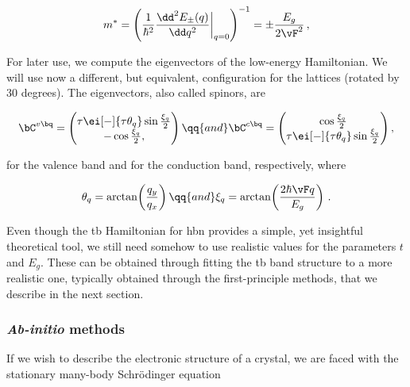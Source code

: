 \begin{equation}
    m^* = \left( \frac{1}{\hbar^2}\frac{\dd^2 E_{\pm}(q)}{\dd q^2} \bigg|_{q=0} \right)^{-1} = \pm \frac{E_g}{2 \vF^2}\,,
    \label{eq:effective_mass_formula}
\end{equation}

\noindent For later use, we compute the eigenvectors of the low-energy Hamiltonian.
We will use now a different, but equivalent, configuration for the lattices (rotated by 30 degrees).
The eigenvectors, also called spinors, are

\begin{equation}
    \bC^{v \bq} =
    \begin{pmatrix}
        \tau \ei[-]{\tau \theta_q} \sin \frac{\xi_q}{2} \\
        - \cos \frac{\xi_q}{2},
    \end{pmatrix}
    \qq{and}
    \bC^{c \bq} =
    \begin{pmatrix}
        \cos \frac{\xi_q}{2} \\
        \tau \ei[-]{\tau \theta_q} \sin \frac{\xi_q}{2}
    \end{pmatrix},
    \label{eq:mono_hBN_valence_conduction_spinors}
\end{equation}

\noindent for the valence band and for the conduction band, respectively, where

\begin{equation}
    \label{eq:theta_xi_isotropic_definitions}
    \theta_q = \arctan\!\left(\frac{q_y}{q_x}\right) \qq{and}  \xi_q = \arctan\!\left(\frac{2 \hbar \vF q}{E_g}\right)\,.
\end{equation}

Even though the \gls{tb} Hamiltonian for \gls{hbn} provides a simple, yet insightful theoretical tool, we still need somehow to use realistic values for the parameters $t$ and $E_g$.
These can be obtained through fitting the \gls{tb} band structure to a more realistic one, typically obtained through the first-principle methods, that we describe in the next section.

\subsubsection{\textit{Ab-initio} methods}
\label{subsubsec:abinit_methods}

If we wish to describe the electronic structure of a crystal, we are faced with the stationary many-body Schr\"{o}dinger equation


